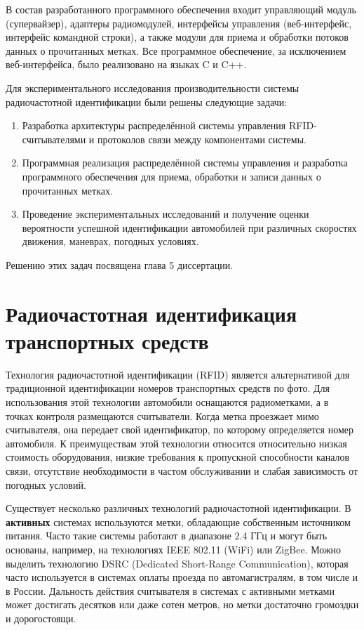 В состав разработанного программного обеспечения входит управляющий модуль (супервайзер), адаптеры радиомодулей, интерфейсы управления (веб-интерфейс, интерфейс командной строки), а также модули для приема и обработки потоков данных о прочитанных метках. Все программное обеспечение, за исключением веб-интерфейса, было реализовано на языках C и C++.

Для экспериментального исследования производительности системы радиочастотной идентификации были решены следующие задачи:

\begin{enumerate}
	\item Разработка архитектуры распределённой системы управления RFID-считывателями и протоколов связи между компонентами системы.
	\item Программная реализация распределённой системы управления и разработка программного обеспечения для приема, обработки и записи данных о прочитанных метках.
	\item Проведение экспериментальных исследований и получение оценки вероятности успешной идентификации автомобилей при различных скоростях движения, маневрах, погодных условиях.
\end{enumerate}

Решению этих задач посвящена глава 5 диссертации.




\section{Радиочастотная идентификация транспортных средств}\label{sec:ch1_rfid}

Технология радиочастотной идентификации (RFID) является альтернативой для традиционной идентификации номеров транспортных средств по фото. Для использования этой технологии автомобили оснащаются радиометками, а в точках контроля размещаются считыватели. Когда метка проезжает мимо считывателя, она передает свой идентификатор, по которому определяется номер автомобиля. К преимуществам этой технологии относится относительно низкая стоимость оборудования, низкие требования к пропускной способности каналов связи, отсутствие необходимости в частом обслуживании и слабая зависимость от погодных условий.

Существует несколько различных технологий радиочастотной идентификации. В \textbf{активных} системах используются метки, обладающие собственным источником питания. Часто такие системы работают в диапазоне 2.4 ГГц и могут быть основаны, например, на технологиях IEEE 802.11 (WiFi) или ZigBee. Можно выделить технологию DSRC (Dedicated Short-Range Communication), которая часто используется в системах оплаты проезда по автомагистралям, в том числе и в России. Дальность действия считывателя в системах с активными метками может достигать десятков или даже сотен метров, но метки достаточно громоздки и дорогостоящи.

